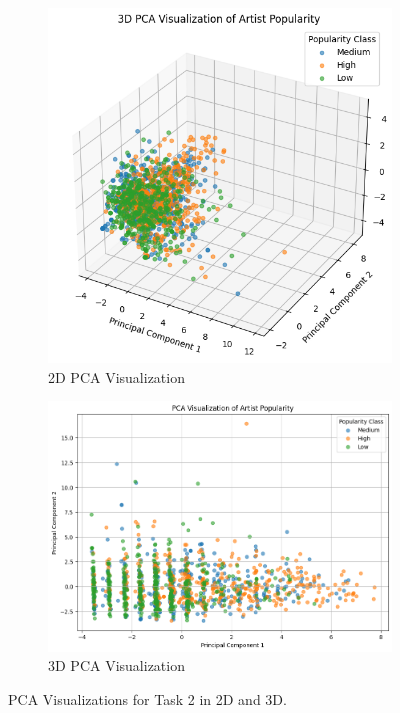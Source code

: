 \documentclass{article}
\begin{document}
\begin{figure}[h]
    \centering
    \begin{subfigure}[b]{0.45\textwidth}
        \centering
        \includegraphics[width=\textwidth]{pca2d_task2.png}
        \caption{2D PCA Visualization}
        \label{fig:pca2d}
    \end{subfigure}
    \hfill
    \begin{subfigure}[b]{0.45\textwidth}
        \centering
        \includegraphics[width=\textwidth]{pca3d_task2.png}
        \caption{3D PCA Visualization}
        \label{fig:pca3d}
    \end{subfigure}
    \caption{PCA Visualizations for Task 2 in 2D and 3D.}
    \label{fig:pca_task2}
\end{figure}
\end{document}
